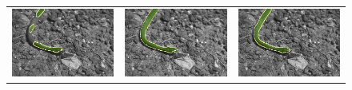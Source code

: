 \documentclass[smallextended]{svjour3}       %
\begin{document}
{{\begin{figure}[ht!]
\begin{tabular}{ccc}
		\includegraphics[scale=0.2]{images/segmentation/bc/snake/gc-seg.png} &
		\includegraphics[scale=0.2]{images/segmentation/schoenemann/snake/snake-seg.png} &
		\includegraphics[scale=0.2]{images/segmentation/bc/snake/corrected-seg.png}\\

\end{tabular}
\end{figure}}}
\end{document}
